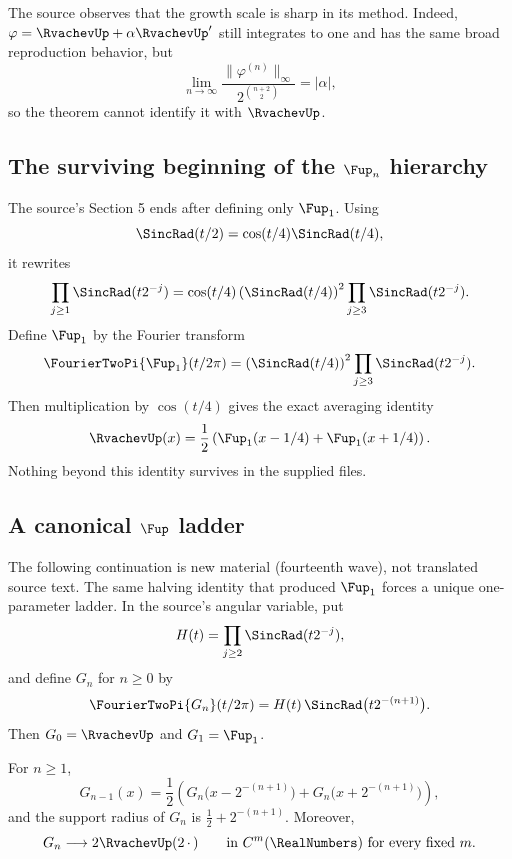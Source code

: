 \documentclass[11pt,oneside]{article}
\numberwithin{equation}{section}
\theoremstyle{definition}
\theoremstyle{remark}
\begin{document}
The source observes that the growth scale is sharp in its method.  Indeed,
$\varphi=\RvachevUp+\alpha\RvachevUp'$ still integrates to one and has the same broad
reproduction behavior, but
\[
 \lim_{n\to\infty}
 \frac{\|\varphi^{(n)}\|_\infty}
 {2^{\binom{n+2}{2}}}=|\alpha|,
\]
so the theorem cannot identify it with $\RvachevUp$.

\subsection{The surviving beginning of the \texorpdfstring{$\Fup_n$}{Fup-n} hierarchy}

The source's Section 5 ends after defining only $\Fup_1$.  Using
\[
 \SincRad(t/2)=\cos(t/4)\SincRad(t/4),
\]
it rewrites
\[
 \prod_{j\ge1}\SincRad(t2^{-j})
 =\cos(t/4)
 \left(\SincRad(t/4)\right)^2
 \prod_{j\ge3}\SincRad(t2^{-j}).
\]
Define $\Fup_1$ by the Fourier transform
\begin{equation}\label{p6:eq:Fup1}
 \FourierTwoPi{\Fup_1}(t/2\pi)=
 \left(\SincRad(t/4)\right)^2
 \prod_{j\ge3}\SincRad(t2^{-j}).
\end{equation}
Then multiplication by $\cos(t/4)$ gives the exact averaging identity
\begin{equation}\label{p6:eq:up-Fup1}
 \RvachevUp(x)=\frac12\left(
 \Fup_1(x-1/4)+\Fup_1(x+1/4)
 \right).
\end{equation}
Nothing beyond this identity survives in the supplied files.

\subsection{A canonical \texorpdfstring{$\Fup$}{Fup} ladder}

The following continuation is new material (fourteenth wave), not translated
source text.  The same halving identity that produced $\Fup_1$ forces a unique
one-parameter ladder.  In the source's angular variable, put
\begin{equation}\label{p6:eq:H-tail}
 H(t)=\prod_{j\ge2}\SincRad(t2^{-j}),
\end{equation}
and define $G_n$ for $n\ge0$ by
\begin{equation}\label{p6:eq:Gn-hat}
 \FourierTwoPi{G_n}(t/2\pi)=H(t)\,\SincRad\bigl(t2^{-(n+1)}\bigr).
\end{equation}
Then $G_0=\RvachevUp$ and $G_1=\Fup_1$.

\begin{proposition}\label{p6:prop:fup-ladder}
For $n\ge1$,
\begin{equation}\label{p6:eq:Gn-recursion}
 G_{n-1}(x)=\frac12\left(
 G_n\bigl(x-2^{-(n+1)}\bigr)+G_n\bigl(x+2^{-(n+1)}\bigr)
 \right),
\end{equation}
and the support radius of $G_n$ is $\tfrac12+2^{-(n+1)}$.  Moreover,
\begin{equation}\label{p6:eq:Gn-limit}
 G_n\longrightarrow2\RvachevUp(2\,\cdot\,)
 \qquad\text{in }C^m(\RealNumbers)\text{ for every fixed }m.
\end{equation}
\end{proposition}
\end{document}
